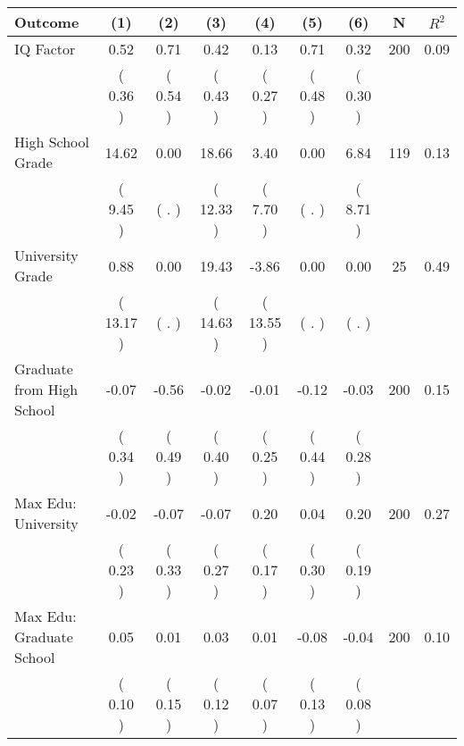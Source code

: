 \begin{tabular}{lcccccccc}
\toprule
 \textbf{Outcome} & \textbf{(1)} & \textbf{(2)} & \textbf{(3)} & \textbf{(4)} & \textbf{(5)} & \textbf{(6)} & \textbf{N} & \textbf{$ R^2$} \\
\midrule
IQ Factor &      0.52 &      0.71 &      0.42 &      0.13 &      0.71 &      0.32 & 200 &       0.09 \\ 
 & (     0.36 ) & (     0.54 ) & (     0.43 ) & (     0.27 ) & (     0.48 ) & (     0.30 ) & \\
High School Grade &     14.62 &      0.00 &     18.66 &      3.40 &      0.00 &      6.84 & 119 &       0.13 \\ 
 & (     9.45 ) & (        . ) & (    12.33 ) & (     7.70 ) & (        . ) & (     8.71 ) & \\
University Grade &      0.88 &      0.00 &     19.43 &     -3.86 &      0.00 &      0.00 & 25 &       0.49 \\ 
 & (    13.17 ) & (        . ) & (    14.63 ) & (    13.55 ) & (        . ) & (        . ) & \\
Graduate from High School &     -0.07 &     -0.56 &     -0.02 &     -0.01 &     -0.12 &     -0.03 & 200 &       0.15 \\ 
 & (     0.34 ) & (     0.49 ) & (     0.40 ) & (     0.25 ) & (     0.44 ) & (     0.28 ) & \\
Max Edu: University &     -0.02 &     -0.07 &     -0.07 &      0.20 &      0.04 &      0.20 & 200 &       0.27 \\ 
 & (     0.23 ) & (     0.33 ) & (     0.27 ) & (     0.17 ) & (     0.30 ) & (     0.19 ) & \\
Max Edu: Graduate School &      0.05 &      0.01 &      0.03 &      0.01 &     -0.08 &     -0.04 & 200 &       0.10 \\ 
 & (     0.10 ) & (     0.15 ) & (     0.12 ) & (     0.07 ) & (     0.13 ) & (     0.08 ) & \\
\bottomrule
\end{tabular}
